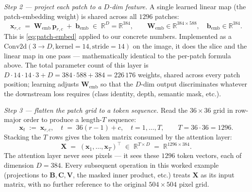 \documentclass[11pt,a4paper]{article}
\begin{document}
\medskip
\noindent\emph{Step 2 — project each patch to a $D$-dim feature.}
A single learned linear map (the patch-embedding weight) is shared
across all $1296$ patches:
\begin{equation}\label{eq:self-worked-embed}
  \bm{x}_{r,c}
   \;=\; \bm{W}_{\text{emb}}\,\bm{p}_{r,c} \;+\; \bm{b}_{\text{emb}}
   \;\in\;\mathbb{R}^{D} = \mathbb{R}^{384},
  \qquad
  \bm{W}_{\text{emb}}\in\mathbb{R}^{384\times 588},
  \quad
  \bm{b}_{\text{emb}}\in\mathbb{R}^{384}.
\end{equation}
This is \eqref{eq:patch-embed} applied to our concrete numbers. Implemented as
a $\mathrm{Conv2d}(3{\to}D, \text{kernel}{=}14, \text{stride}{=}14)$
on the image, it does the slice and the linear map in one pass —
mathematically identical to the per-patch formula above. The total
parameter count of this layer is $D \cdot 14\!\cdot\!14\!\cdot\!3 + D
= 384 \cdot 588 + 384 = 226\,176$ weights, shared across every patch
position; learning adjusts $\bm{W}_{\text{emb}}$ so that the
$D$-dim output discriminates whatever the downstream loss requires
(class identity, depth, semantic mask, etc.).

\medskip
\noindent\emph{Step 3 — flatten the patch grid to a token sequence.}
Read the $36\!\times\!36$ grid in row-major order to produce a length-$T$
sequence:
\begin{equation}
  \bm{x}_t \;:=\; \bm{x}_{r,c},\quad t \;=\; 36(r{-}1) + c,\quad t = 1, \dots, T,
  \qquad
  T = 36 \cdot 36 = 1296.
\end{equation}
Stacking the $T$ rows gives the token matrix consumed by the
attention layer:
\begin{equation}
  \bm{X}\;=\;(\bm{x}_1, \dots, \bm{x}_T)^\top
   \;\in\; \mathbb{R}^{T \times D} \;=\; \mathbb{R}^{1296 \times 384}.
\end{equation}
The attention layer never sees pixels — it sees these $1296$ token
vectors, each of dimension $D = 384$. Every subsequent
operation in this worked example (projections to $\bm{B}, \bm{C},
\bm{V}$, the masked inner product, etc.) treats $\bm{X}$ as its
input matrix, with no further reference to the original
\texorpdfstring{$504\!\times\!504$}{504x504} pixel grid.
\end{document}
